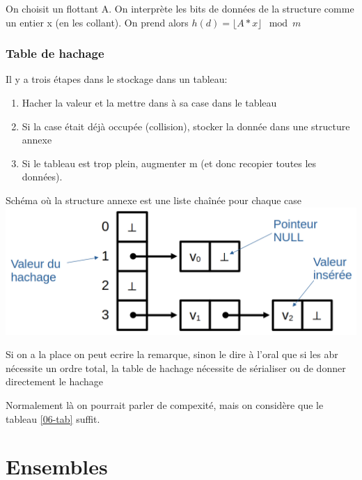 \begin{example}
	On choisit un flottant A. On interprète les bits de données de la structure comme un entier x (en les collant). On prend alors $h(d) = \lfloor A*x \rfloor \mod m$
\end{example}

\subsubsection{Table de hachage}

Il y a trois étapes dans le stockage dans un tableau: \begin{enumerate}
	\item Hacher la valeur et la mettre dans à sa case dans le tableau
	\item Si la case était déjà occupée (collision), stocker la donnée dans une structure annexe
	\item Si le tableau est trop plein, augmenter m (et donc recopier toutes les données).
\end{enumerate}

\begin{example} Schéma où la structure annexe est une liste chaînée pour chaque case\\
	\includegraphics[width = 0.7\linewidth]{lecon/06-ensembles_et_dictionnaires/table_hachage.png}
\end{example}

\begin{com}
	Si on a la place on peut ecrire la remarque, sinon le dire à l'oral que si les abr nécessite un ordre total, la table de hachage nécessite de sérialiser ou de donner directement le hachage
\end{com}

\begin{com}
	Normalement là on pourrait parler de compexité, mais on considère que le tableau \ref{06-tab} suffit.
\end{com}

\section{Ensembles}

